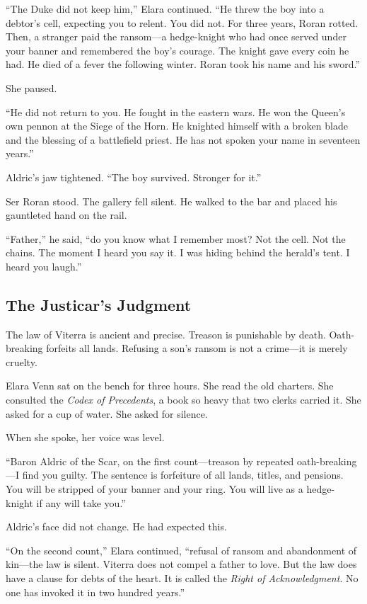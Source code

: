 \documentclass[11pt]{book}
\begin{document}
``The Duke did not keep him,'' Elara continued. ``He threw the boy into a debtor's cell, expecting you to relent. You did not. For three years, Roran rotted. Then, a stranger paid the ransom---a hedge-knight who had once served under your banner and remembered the boy's courage. The knight gave every coin he had. He died of a fever the following winter. Roran took his name and his sword.''

She paused.

``He did not return to you. He fought in the eastern wars. He won the Queen's own pennon at the Siege of the Horn. He knighted himself with a broken blade and the blessing of a battlefield priest. He has not spoken your name in seventeen years.''

Aldric's jaw tightened. ``The boy survived. Stronger for it.''

Ser Roran stood. The gallery fell silent. He walked to the bar and placed his gauntleted hand on the rail.

``Father,'' he said, ``do you know what I remember most? Not the cell. Not the chains. The moment I heard you say it. I was hiding behind the herald's tent. I heard you laugh.''

\subsection*{The Justicar's Judgment}

The law of Viterra is ancient and precise. Treason is punishable by death. Oath-breaking forfeits all lands. Refusing a son's ransom is not a crime---it is merely cruelty.

Elara Venn sat on the bench for three hours. She read the old charters. She consulted the \textit{Codex of Precedents}, a book so heavy that two clerks carried it. She asked for a cup of water. She asked for silence.

When she spoke, her voice was level.

``Baron Aldric of the Scar, on the first count---treason by repeated oath-breaking---I find you guilty. The sentence is forfeiture of all lands, titles, and pensions. You will be stripped of your banner and your ring. You will live as a hedge-knight if any will take you.''

Aldric's face did not change. He had expected this.

``On the second count,'' Elara continued, ``refusal of ransom and abandonment of kin---the law is silent. Viterra does not compel a father to love. But the law does have a clause for debts of the heart. It is called the \textit{Right of Acknowledgment}. No one has invoked it in two hundred years.''
\end{document}
